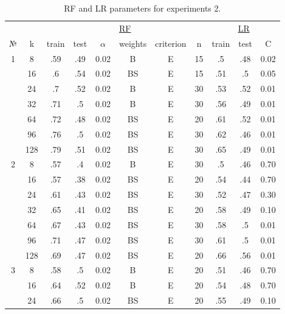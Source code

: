 \begin{table}
\centering
\caption{RF and LR parameters for experiments 2.}
\label{tab:params_2_rf_lr}
\begin{tabular}{|c|c|cccccc||ccc|}\hline
& & \multicolumn{6}{c||}{\underline{RF}} & \multicolumn{3}{c|}{\underline{LR}}\\
№ &   k & train & test & $\alpha$ & weights & criterion &  n & train & test &    C \\\hline
1 &   8 &   .59 &  .49 &     0.02 &       B &         E & 15 &    .5 &  .48 & 0.02 \\
  &  16 &    .6 &  .54 &     0.02 &      BS &         E & 15 &   .51 &   .5 & 0.05 \\
  &  24 &    .7 &  .52 &     0.02 &       B &         E & 30 &   .53 &  .52 & 0.01 \\
  &  32 &   .71 &   .5 &     0.02 &       B &         E & 30 &   .56 &  .49 & 0.01 \\
  &  64 &   .72 &  .48 &     0.02 &      BS &         E & 20 &   .61 &  .52 & 0.01 \\
  &  96 &   .76 &   .5 &     0.02 &      BS &         E & 30 &   .62 &  .46 & 0.01 \\
  & 128 &   .79 &  .51 &     0.02 &      BS &         E & 30 &   .65 &  .49 & 0.01 \\\hline
2 &   8 &   .57 &   .4 &     0.02 &       B &         E & 30 &    .5 &  .46 & 0.70 \\
  &  16 &   .57 &  .38 &     0.02 &      BS &         E & 20 &   .54 &  .44 & 0.70 \\
  &  24 &   .61 &  .43 &     0.02 &      BS &         E & 30 &   .52 &  .47 & 0.30 \\
  &  32 &   .65 &  .41 &     0.02 &      BS &         E & 20 &   .58 &  .49 & 0.10 \\
  &  64 &   .67 &  .43 &     0.02 &      BS &         E & 30 &   .58 &   .5 & 0.01 \\
  &  96 &   .71 &  .47 &     0.02 &      BS &         E & 30 &   .61 &   .5 & 0.01 \\
  & 128 &   .69 &  .47 &     0.02 &      BS &         E & 20 &   .66 &  .56 & 0.01 \\\hline
3 &   8 &   .58 &   .5 &     0.02 &       B &         E & 20 &   .51 &  .46 & 0.70 \\
  &  16 &   .64 &  .52 &     0.02 &       B &         E & 20 &   .54 &  .48 & 0.70 \\
  &  24 &   .66 &   .5 &     0.02 &      BS &         E & 20 &   .55 &  .49 & 0.10 \\

\end{tabular}
\end{table}

